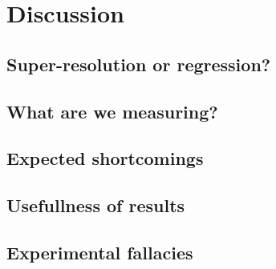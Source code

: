 \chapter{Discussion}

\section{Super-resolution or regression?}

\section{What are we measuring?}

\section{Expected shortcomings}

\section{Usefullness of results}

\section{Experimental fallacies}
